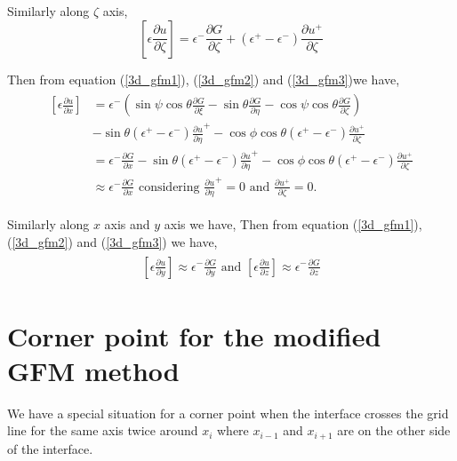 Similarly along $\zeta $ axis, 
\begin{equation}
	\left[\epsilon \frac{\partial u}{\partial \zeta}\right]= \epsilon^-\frac{\partial G}{\partial \zeta}+(\epsilon^+-\epsilon^-)\frac{\partial u^+}{\partial \zeta }\label{3d_gfm3}
\end{equation}
 
 Then from equation (\ref{3d_gfm1}), (\ref{3d_gfm2}) and (\ref{3d_gfm3})we have,
\begin{eqnarray}
\begin{aligned}   
		\left[\epsilon \frac{\partial u}{\partial x}\right]&= \epsilon^-\left( \sin \psi \cos \theta \frac{\partial G}{\partial \xi}-\sin \theta \frac{\partial G}{\partial \eta}-\cos \psi \cos \theta \frac{\partial G}{\partial \zeta}\right)\\
		 &-\sin\theta (\epsilon^+-\epsilon^-)\frac{\partial u}{\partial \eta}^+ -\cos{\phi} \cos \theta (\epsilon^+-\epsilon^-) \frac{\partial u^+}{\partial \zeta }\\
		 &=\epsilon^- \frac{\partial G}{\partial x}-\sin\theta (\epsilon^+-\epsilon^-)\frac{\partial u}{\partial \eta}^+ -\cos{\phi} \cos \theta (\epsilon^+-\epsilon^-) \frac{\partial u^+}{\partial \zeta }\\
		 &\approx \epsilon^- \frac{\partial G}{\partial x}\text{     considering } \frac{\partial u}{\partial \eta}^+ =0 \text{ and } \frac{\partial u^+}{\partial \zeta }=0.  
\end{aligned}\label{eq:m-gfm1}		  	
\end{eqnarray}

  Similarly along $x$ axis and $y$ axis we have, 
  Then from equation (\ref{3d_gfm1}), (\ref{3d_gfm2}) and (\ref{3d_gfm3}) we have,
    \begin{eqnarray}
    \begin{aligned}  
   \left[\epsilon \frac{\partial u}{\partial y}\right]\approx\epsilon^- \frac{\partial G}{\partial y}\text{ and } \left[\epsilon \frac{\partial u}{\partial z}\right]\approx\epsilon^- \frac{\partial G}{\partial z}\label{eq:m-gfm2}
    \end{aligned}		  	
    \end{eqnarray}

\section{Corner point for the modified GFM method}
We have a special situation for a corner point when the interface crosses the grid line for the same axis twice around $x_i$ where $x_{i-1}$ and $x_{i+1}$ are on the other side of the interface.   
		
